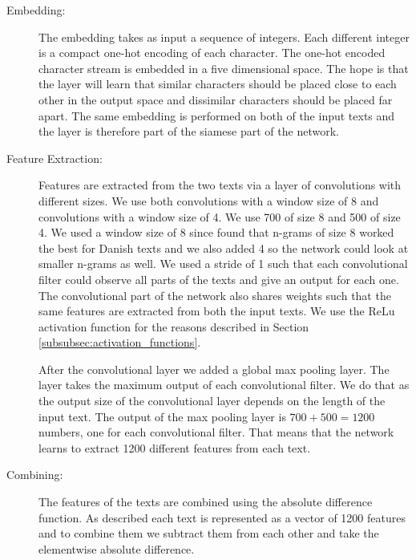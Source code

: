 \begin{description}

    \item[Embedding:]

        The embedding takes as input a sequence of integers. Each different
        integer is a compact one-hot encoding of each character. The one-hot
        encoded character stream is embedded in a five dimensional space. The
        hope is that the layer will learn that similar characters should be
        placed close to each other in the output space and dissimilar characters
        should be placed far apart. The same embedding is performed on both of
        the input texts and the layer is therefore part of the siamese part of
        the network.

    \item[Feature Extraction:]

        Features are extracted from the two texts via a layer of convolutions
        with different sizes. We use both convolutions with a window size of
        8 and convolutions with a window size of 4. We use 700 of size 8 and
        500 of size 4. We used a window size of 8 since \citet{aalykke2016}
        found that n-grams of size 8 worked the best for Danish texts and we
        also added 4 so the network could look at smaller n-grams as well.
        We used a stride of 1 such that each convolutional filter could
        observe all parts of the texts and give an output for each one. The
        convolutional part of the network also shares weights such that the
        same features are extracted from both the input texts. We use the
        \gls{ReLu} activation function for the reasons described in Section
        \ref{subsubsec:activation_functions}.

        After the convolutional layer we added a global max pooling layer. The
        layer takes the maximum output of each convolutional filter. We do that
        as the output size of the convolutional layer depends on the length of
        the input text. The output of the max pooling layer is $700 + 500 =
        1200$ numbers, one for each convolutional filter. That means that the
        network learns to extract 1200 different features from each text.

    \item[Combining:]

        The features of the texts are combined using the absolute difference
        function. As described each text is represented as a vector of 1200
        features and to combine them we subtract them from each other and take
        the elementwise absolute difference.


\end{description}
